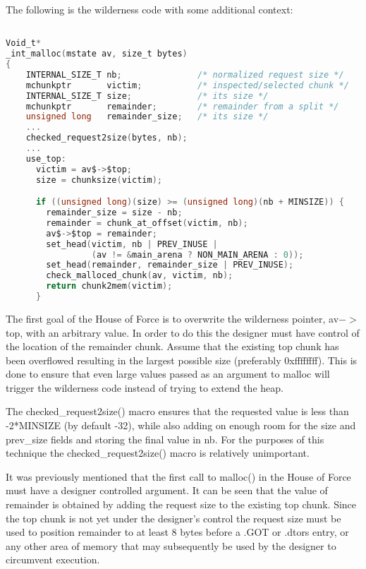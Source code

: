 \documentclass[12pt]{article}
\begin{document}
The following is the wilderness code with some additional context:
\begin{lstlisting}[language=C]

Void_t*
_int_malloc(mstate av, size_t bytes)
{
    INTERNAL_SIZE_T nb;               /* normalized request size */
    mchunkptr       victim;           /* inspected/selected chunk */
    INTERNAL_SIZE_T size;             /* its size */
    mchunkptr       remainder;        /* remainder from a split */
    unsigned long   remainder_size;   /* its size */
    ...
    checked_request2size(bytes, nb);
    ...
    use_top:
      victim = av$->$top;
      size = chunksize(victim);

      if ((unsigned long)(size) >= (unsigned long)(nb + MINSIZE)) {
        remainder_size = size - nb;
        remainder = chunk_at_offset(victim, nb);
        av$->$top = remainder;
        set_head(victim, nb | PREV_INUSE |
                 (av != &main_arena ? NON_MAIN_ARENA : 0));
        set_head(remainder, remainder_size | PREV_INUSE);
        check_malloced_chunk(av, victim, nb);
        return chunk2mem(victim);
      }
\end{lstlisting}
The first goal of the House of Force is to overwrite the wilderness
pointer, av$->$top, with an arbitrary value. In order to do this the
designer must have control of the location of the remainder chunk.
Assume that the existing top chunk has been overflowed resulting in
the largest possible size (preferably 0xffffffff). This is done to
ensure that even large values passed as an argument to malloc will
trigger the wilderness code instead of trying to extend the heap.
\newline


The checked_request2size() macro ensures that the requested value
is less than -2*MINSIZE (by default -32), while also adding on
enough room for the size and prev_size fields and storing the final
value in nb. For the purposes of this technique the
checked_request2size() macro is relatively unimportant.
\newline


It was previously mentioned that the first call to malloc() in the
House of Force must have a designer controlled argument. It can be
seen that the value of remainder is obtained by adding the request
size to the existing top chunk. Since the top chunk is not yet
under the designer's control the request size must be used to
position remainder to at least 8 bytes before a .GOT or .dtors
entry, or any other area of memory that may subsequently be used by
the designer to circumvent execution.
\newline
\end{document}
